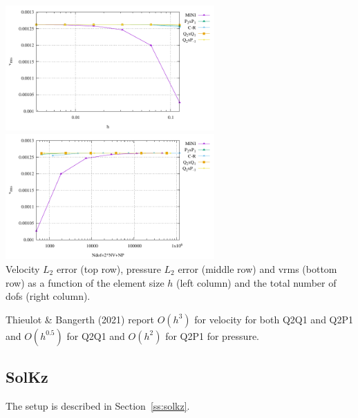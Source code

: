 \begin{center}
\includegraphics[width=8cm]{python_codes/fieldstone_112/results/exp3/vrms.pdf}
\includegraphics[width=8cm]{python_codes/fieldstone_112/results/exp3/vrms_ndof.pdf}\\
{\captionfont Velocity $L_2$ error (top row), pressure $L_2$ error (middle row) and vrms (bottom row) 
as a function of the element size $h$ (left column) and the total number of dofs (right column).}
\end{center}

Thieulot \& Bangerth (2021) \cite{thba21} report $O(h^3)$ for velocity for both Q2Q1 and Q2P1
and $O(h^{0.5})$ for Q2Q1 and  $O(h^{2})$ for Q2P1 for pressure. 

\newpage
\subsection*{SolKz}

The setup is described in Section~\ref{ss:solkz}. 

